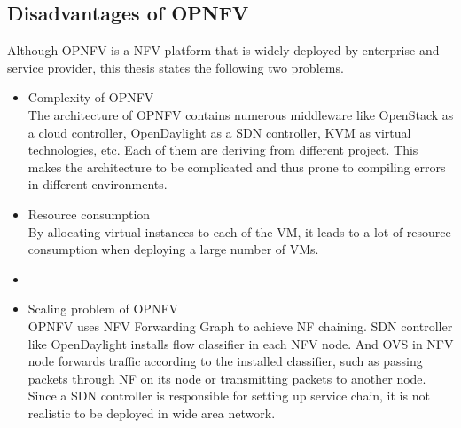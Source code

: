 \subsection{Disadvantages of OPNFV}
Although OPNFV is a NFV platform that is widely deployed by enterprise and service provider, this thesis states the following two problems.
\begin{itemize}
	\item Complexity of OPNFV \\
		The architecture of OPNFV contains numerous middleware like OpenStack as a cloud controller, OpenDaylight\cite{OpenDaylight} as a SDN controller, KVM as virtual technologies, etc. Each of them are deriving from different project. This makes the architecture to be complicated and thus prone to compiling errors in different environments. 
	\item Resource consumption \\
		By allocating virtual instances to each of the VM, it leads to a lot of resource consumption when deploying a large number of VMs. 
	\item 
	\item Scaling problem of OPNFV \\
		OPNFV uses NFV Forwarding Graph to achieve NF chaining. SDN controller like OpenDaylight installs flow classifier in each NFV node. And OVS in NFV node forwards traffic according to the installed classifier, such as passing packets through NF on its node or transmitting packets to another node. Since a SDN controller is responsible for setting up service chain, it is not realistic to be deployed in wide area network. 
\end{itemize}



